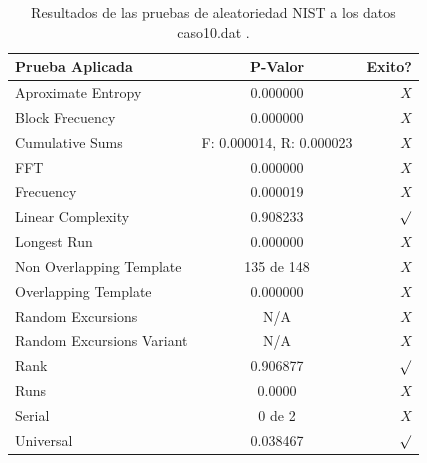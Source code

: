 \documentclass[10pt]{IEEEtran}
\begin{document}
\begin{table}[H]
\caption{Resultados de las pruebas de aleatoriedad NIST a los datos caso10.dat .}
\label{caso7}
\begin{center}
\begin{small}
\begin{tabular}{|l|c|r|}
\hline

Prueba Aplicada &  P-Valor & Exito? \\
\hline

Aproximate Entropy    &     0.000000 & $X$ \\

Block Frecuency  & 0.000000  &  $X$  \\

Cumulative Sums    &   F: 0.000014, R: 0.000023  & $X$ \\

FFT    &    0.000000   &   $X$      \\

Frecuency     & 0.000019 &  $X$   \\

Linear Complexity      &  0.908233  & $\surd$ \\

Longest Run      &   0.000000 &   $X$     \\

Non Overlapping Template      & 135 de 148    &    $X$          \\

Overlapping Template      &    0.000000   &       $X$        \\

Random Excursions      & N/A  &    $X$      \\

Random Excursions Variant & N/A &     $X$    \\

Rank &  0.906877  &      $\surd$      \\

Runs &     0.0000  &       $X$      \\

Serial &     0 de 2    &     $X$        \\

Universal &        0.038467  &     $\surd$           \\

\hline

\end{tabular}
\end{small}
\end{center}
\end{table}
\end{document}
